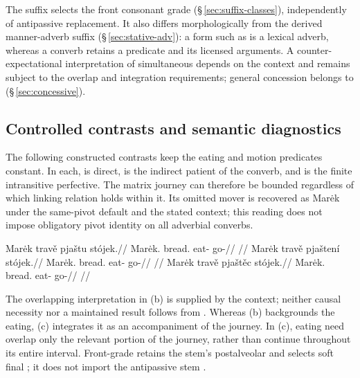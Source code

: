 The suffix selects the front consonant grade
(§\,\ref{sec:suffix-classes}), independently of antipassive replacement.
It also differs morphologically from the derived manner-adverb suffix
 (§\,\ref{sec:stative-adv}): a form such as 
 is a lexical adverb, whereas a converb retains a predicate and
its licensed arguments. A counter-expectational interpretation of simultaneous
 depends on the context and remains subject to the overlap and
integration requirements; general concession belongs to 
(§\,\ref{sec:concessive}).

\subsection{Controlled contrasts and semantic diagnostics}
\label{sec:converb-diagnostics}

The following constructed contrasts keep the eating and motion predicates
constant. In each,  is direct,  is the indirect patient
of the converb, and  is the finite intransitive perfective. The
matrix journey can therefore be bounded regardless of which linking relation
holds within it. Its omitted mover is recovered as Marėk under the same-pivot
default and the stated context; this reading does not impose obligatory
pivot identity on all adverbial converbs.

\pex\label{ex:core-converb-contrast}
\a
\begingl
\gla Marėk travě pjaštu stójek.//
\glb Marėk.\Dir{} bread.\Ind{} eat-\Seq{} go-\Pf{}//
\glft {}
//
\endgl
\a
\begingl
\gla Marėk travě pjaštení stójek.//
\glb Marėk.\Dir{} bread.\Ind{} eat-\Circ{} go-\Pf{}//
\glft {}
//
\endgl
\a
\begingl
\gla Marėk travě pjaštěc stójek.//
\glb Marėk.\Dir{} bread.\Ind{} eat-\Sim{} go-\Pf{}//
\glft {}
//
\endgl
\xe

The overlapping interpretation in (b) is supplied by the context; neither
causal necessity nor a maintained result follows from . Whereas
(b) backgrounds the eating, (c) integrates it as an accompaniment of the
journey. In (c), eating need overlap only the relevant portion of the journey, rather
than continue throughout its entire interval. Front-grade 
retains the stem's postalveolar and selects soft final ; it does not
import the antipassive stem .

